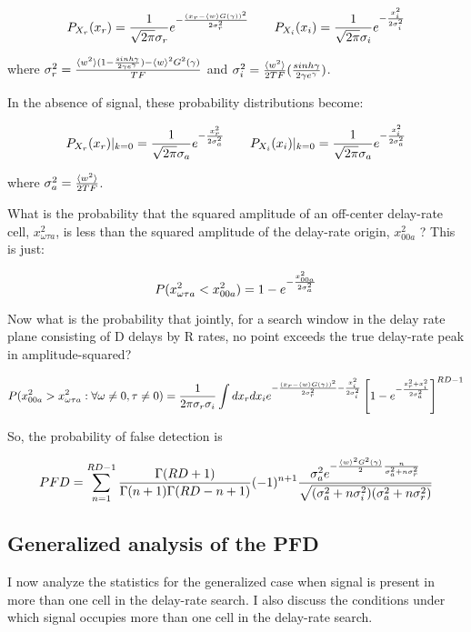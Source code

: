 $$P_{X_r}(x_r) = {1\over\sqrt{2\pi}\sigma_r}
                  e^{-{(x_r - \langle w\rangle G(\gamma))^2\over2\sigma_r^2}} \qquad
  P_{X_i}(x_i) = {1\over\sqrt{2\pi}\sigma_i}
                  e^{-{x_i^2\over2\sigma_i^2}}$$

where
$\sigma_r^2 = {\langle w^2\rangle (1-{sinh\gamma\over2\gamma e^\gamma}) - \langle w\rangle ^2G^2(\gamma)\over TF}$ and
$\sigma_i^2 = {\langle w^2\rangle \over2TF}({sinh\gamma\over2\gamma e^\gamma})$.

In the absence of signal, these probability distributions become:

$$P_{X_r}(x_r)|_{k=0} = {1\over\sqrt{2\pi}\sigma_a}
                  e^{-{x_r^2\over2\sigma_a^2}} \qquad
  P_{X_i}(x_i)|_{k=0} = {1\over\sqrt{2\pi}\sigma_a}
                  e^{-{x_i^2\over2\sigma_a^2}}$$

where
$\sigma_a^2 = {\langle w^2\rangle \over2TF}$.

What is the probability that the squared amplitude of an off-center
delay-rate cell, $x_{\omega\tau a}^2$, is less than the squared
amplitude of the delay-rate origin, $x_{00a}^2$ ?  This is just:

$$P(x_{\omega\tau a}^2 < x_{00a}^2) = 1 - e^{-{x_{00a}^2\over 2\sigma_a^2}}$$

Now what is the probability that jointly, for a search window in the delay
rate plane consisting of D delays by R rates, no point exceeds the
true delay-rate peak in amplitude-squared?

$$P(x_{00a}^2 > x^2_{\omega\tau a}: \forall \omega\neq0, \tau\neq0 )
= {1\over2\pi\sigma_r\sigma_i} \int dx_rdx_i
  e^{-{(x_r-\langle w\rangle G(\gamma))^2\over2\sigma_r^2}-{x_i^2\over2\sigma_i^2}}
  \left[1 - e^{-{x_r^2+x_i^2\over2\sigma_a^2}}\right]^{RD-1}$$

So, the probability of false detection is

$$PFD= \sum\limits_{n=1}^{RD-1}{\Gamma(RD+1)\over\Gamma(n+1)\Gamma(RD-n+1)}(-1)^{n+1}
  {\sigma_a^2e^{-{\langle w\rangle^2G^2(\gamma)\over2}{n\over\sigma_a^2+n\sigma_r^2}}\over\sqrt{(\sigma_a^2+n\sigma_i^2)(\sigma_a^2+n\sigma_r^2)}}$$

\subsection{Generalized analysis of the PFD}

I now analyze the statistics for the generalized case when signal is
present in more than one cell in the delay-rate search.  I also
discuss the conditions under which signal occupies more than one cell
in the delay-rate search.

